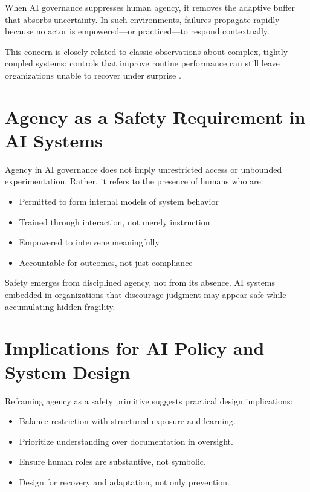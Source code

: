 \documentclass[11pt]{article}
\begin{document}
When AI governance suppresses human agency, it removes the adaptive buffer that absorbs
uncertainty. In such environments, failures propagate rapidly because no actor is
empowered---or practiced---to respond contextually.

This concern is closely related to classic observations about complex, tightly coupled
systems: controls that improve routine performance can still leave organizations unable
to recover under surprise \citep{Perrow1984Normal}.

\section{Agency as a Safety Requirement in AI Systems}

Agency in AI governance does not imply unrestricted access or unbounded experimentation.
Rather, it refers to the presence of humans who are:

\begin{itemize}
  \item Permitted to form internal models of system behavior
  \item Trained through interaction, not merely instruction
  \item Empowered to intervene meaningfully
  \item Accountable for outcomes, not just compliance
\end{itemize}

Safety emerges from disciplined agency, not from its absence. AI systems embedded in
organizations that discourage judgment may appear safe while accumulating hidden
fragility.

\section{Implications for AI Policy and System Design}

Reframing agency as a safety primitive suggests practical design implications:

\begin{itemize}
  \item Balance restriction with structured exposure and learning.
  \item Prioritize understanding over documentation in oversight.
  \item Ensure human roles are substantive, not symbolic.
  \item Design for recovery and adaptation, not only prevention.
\end{itemize}
\end{document}
